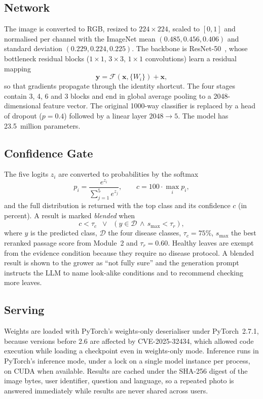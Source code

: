 \subsection{Network}
The image is converted to RGB, resized to $224\times224$, scaled to $[0,1]$ and normalised per channel with the ImageNet
mean $(0.485, 0.456, 0.406)$ and standard deviation $(0.229, 0.224, 0.225)$. The backbone is ResNet-50~\cite{he2016resnet},
whose bottleneck residual blocks ($1\times1$, $3\times3$, $1\times1$ convolutions) learn a residual mapping
\begin{equation}
\mathbf{y} = \mathcal{F}(\mathbf{x}, \{W_i\}) + \mathbf{x},
\end{equation}
so that gradients propagate through the identity shortcut. The four stages contain 3, 4, 6 and 3 blocks and end in
global average pooling to a 2048-dimensional feature vector. The original 1000-way classifier is replaced by a head of
dropout ($p=0.4$) followed by a linear layer $2048\rightarrow5$. The model has 23.5~million parameters.

\subsection{Confidence Gate}
The five logits $z_i$ are converted to probabilities by the softmax
\begin{equation}
p_i = \frac{e^{z_i}}{\sum_{j=1}^{5} e^{z_j}}, \qquad c = 100\cdot\max_i p_i ,
\end{equation}
and the full distribution is returned with the top class and its confidence $c$ (in percent). A result is marked
\emph{blended} when
\begin{equation}
c < \tau_c \;\;\lor\;\; (y \in \mathcal{D} \,\land\, s_{\max} < \tau_r),
\label{eq:blend}
\end{equation}
where $y$ is the predicted class, $\mathcal{D}$ the four disease classes, $\tau_c=75\%$, $s_{\max}$ the best reranked
passage score from Module~2 and $\tau_r=0.60$. Healthy leaves are
exempt from the evidence condition because they require no disease protocol. A blended result is shown to the grower
as ``not fully sure'' and the generation prompt instructs the LLM to name look-alike conditions and to recommend
checking more leaves.

\subsection{Serving}
Weights are loaded with PyTorch's weights-only deserialiser under PyTorch~2.7.1, because versions before 2.6 are
affected by CVE-2025-32434, which allowed code execution while loading a checkpoint even in weights-only mode.
Inference runs in PyTorch's inference mode, under a lock on a single model instance per process, on CUDA when
available. Results are cached under the SHA-256 digest of the image bytes, user identifier,
question and language, so a repeated photo is answered immediately while results are never shared across users.

